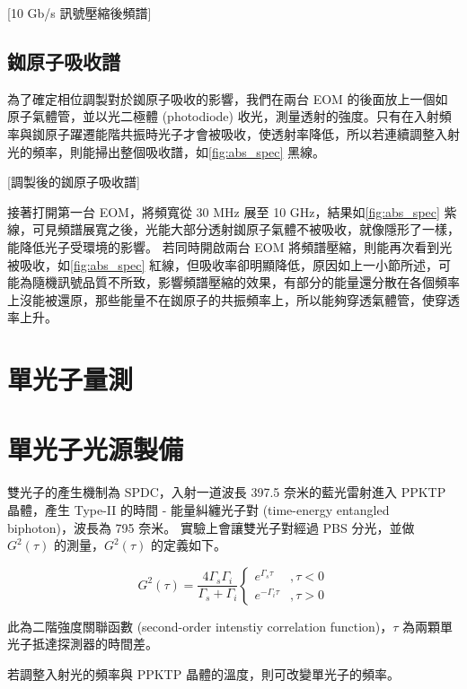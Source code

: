 \documentclass[class=NCU_thesis, crop=false]{standalone}
\begin{document}
[10 Gb/s 訊號壓縮後頻譜]

\subsection{銣原子吸收譜}
為了確定相位調製對於銣原子吸收的影響，我們在兩台 EOM 的後面放上一個如原子氣體管，並以光二極體 (photodiode) 收光，測量透射的強度。只有在入射頻率與銣原子躍遷能階共振時光子才會被吸收，使透射率降低，所以若連續調整入射光的頻率，則能掃出整個吸收譜，如\cref{fig:abs_spec} 黑線。

[調製後的銣原子吸收譜]

接著打開第一台 EOM，將頻寬從 30 MHz 展至 10 GHz，結果如\cref{fig:abs_spec} 紫線，可見頻譜展寬之後，光能大部分透射銣原子氣體不被吸收，就像隱形了一樣，能降低光子受環境的影響。
若同時開啟兩台 EOM 將頻譜壓縮，則能再次看到光被吸收，如\cref{fig:abs_spec} 紅線，但吸收率卻明顯降低，原因如上一小節所述，可能為隨機訊號品質不所致，影響頻譜壓縮的效果，有部分的能量還分散在各個頻率上沒能被還原，那些能量不在銣原子的共振頻率上，所以能夠穿透氣體管，使穿透率上升。

\section{單光子量測}

\section{單光子光源製備}
雙光子的產生機制為 SPDC，入射一道波長 397.5 奈米的藍光雷射進入 PPKTP 晶體，產生 Type-II 的時間 - 能量糾纏光子對 (time-energy entangled biphoton)，波長為 795 奈米。
實驗上會讓雙光子對經過 PBS 分光，並做 $G^{2}(\tau)$ 的測量，$G^{2}(\tau)$ 的定義如下。

\begin{equation}
    G^{2}(\tau)=\frac{4\Gamma_{s}\Gamma_{i}}{\Gamma_{s}+\Gamma_{i}}\left\{\begin{matrix}
        e^{\Gamma_{s}\tau} & ,\tau<0\\
        e^{-\Gamma_{i}\tau} & ,\tau>0
        \end{matrix}\right.
\end{equation}

此為二階強度關聯函數 (second-order intenstiy correlation function)，$\tau$ 為兩顆單光子抵達探測器的時間差。

若調整入射光的頻率與 PPKTP 晶體的溫度，則可改變單光子的頻率。
\end{document}
